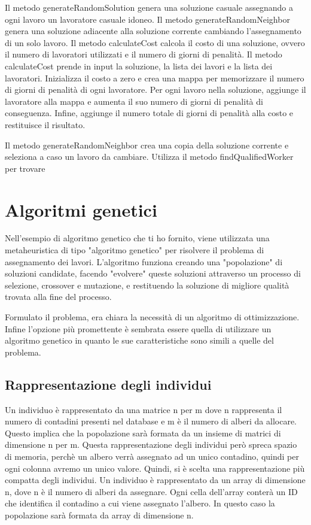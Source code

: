 Il metodo generateRandomSolution genera una soluzione casuale assegnando a ogni lavoro un lavoratore casuale idoneo. Il metodo generateRandomNeighbor genera una soluzione adiacente alla soluzione corrente cambiando l'assegnamento di un solo lavoro. Il metodo calculateCost calcola il costo di una soluzione, ovvero il numero di lavoratori utilizzati e il numero di giorni di penalità.
Il metodo calculateCost prende in input la soluzione, la lista dei lavori e la lista dei lavoratori. Inizializza il costo a zero e crea una mappa per memorizzare il numero di giorni di penalità di ogni lavoratore. Per ogni lavoro nella soluzione, aggiunge il lavoratore alla mappa e aumenta il suo numero di giorni di penalità di conseguenza. Infine, aggiunge il numero totale di giorni di penalità alla costo e restituisce il risultato.

Il metodo generateRandomNeighbor crea una copia della soluzione corrente e seleziona a caso un lavoro da cambiare. Utilizza il metodo findQualifiedWorker per trovare

\section{Algoritmi genetici}
Nell'esempio di algoritmo genetico che ti ho fornito, viene utilizzata una metaheuristica di tipo "algoritmo genetico" per risolvere il problema di assegnamento dei lavori. L'algoritmo funziona creando una "popolazione" di soluzioni candidate, facendo "evolvere" queste soluzioni attraverso un processo di selezione, crossover e mutazione, e restituendo la soluzione di migliore qualità trovata alla fine del processo.
             
Formulato il problema, era chiara la necessità di un  algoritmo di ottimizzazione. 
Infine l’opzione più promettente è sembrata essere quella di utilizzare un algoritmo genetico in quanto le sue caratteristiche sono simili a quelle del problema.

\subsection{Rappresentazione degli individui}
Un individuo è rappresentato da una matrice  n per m dove n rappresenta il numero di contadini presenti nel database e m  è il numero di alberi da allocare. 
Questo implica che la popolazione sarà formata da un insieme di matrici di dimensione n per m.
Questa rappresentazione degli individui però spreca spazio di memoria, perchè un albero verrà assegnato ad un unico contadino, quindi per ogni colonna avremo un unico valore. Quindi, si è scelta una rappresentazione più compatta degli individui. 
Un individuo è rappresentato da un array di dimensione n, dove n è il numero di alberi da assegnare. Ogni cella dell'array conterà un ID che identifica il contadino a cui viene assegnato l'albero. 
In questo caso la popolazione sarà formata da array di dimensione n. 


